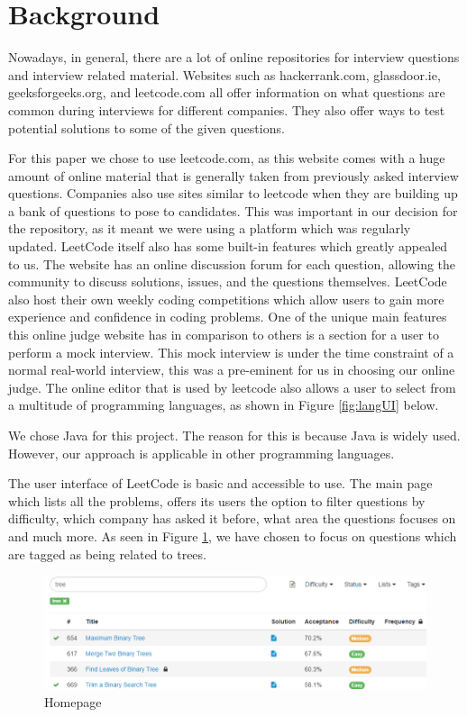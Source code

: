 \documentclass[10pt,twocolumn,hidelinks]{IEEEtran}
\begin{document}
\section{Background}
\par Nowadays, in general, there are a lot of online repositories for interview questions and interview related material. Websites such as hackerrank.com, glassdoor.ie, geeksforgeeks.org, and leetcode.com all offer information on what questions are common during interviews for different companies. They also offer ways to test potential solutions to some of the given questions. 
\par For this paper we chose to use leetcode.com\cite{leet1}, as this website comes with a huge amount of online material that is generally taken from previously asked interview questions. Companies also use sites similar to leetcode when they are building up a bank of questions to pose to candidates. This was important in our decision for the repository, as it meant we were using a platform which was regularly updated. LeetCode itself also has some built-in features which greatly appealed to us. The website has an online discussion forum for each question, allowing the community to discuss solutions, issues, and the questions themselves. LeetCode also host their own weekly coding competitions which allow users to gain more experience and confidence in coding problems. One of the unique main features this online judge website has in comparison to others is a section for a user to perform a mock interview. This mock interview is under the time constraint of a normal real-world interview, this was a pre-eminent for us in choosing our online judge. The online editor that is used by leetcode also allows a user to select from a multitude of programming languages, as shown in Figure \ref{fig:langUI} below.
\par We chose Java for this project. The reason for this is because Java is widely used. However, our approach is applicable in other programming languages.  
\par The user interface of LeetCode is basic and accessible to use. The main page which lists all the problems, offers its users the option to filter questions by difficulty, which company has asked it before, what area the questions focuses on and much more. As seen in Figure \ref{fig:homepage}, we have chosen to focus on questions which are tagged as being related to trees. 
\begin{figure}[h]
\includegraphics[scale=0.4]{homepageUI.png}
\caption{Homepage}
\label{fig:homepage}
\end{figure}
\end{document}
